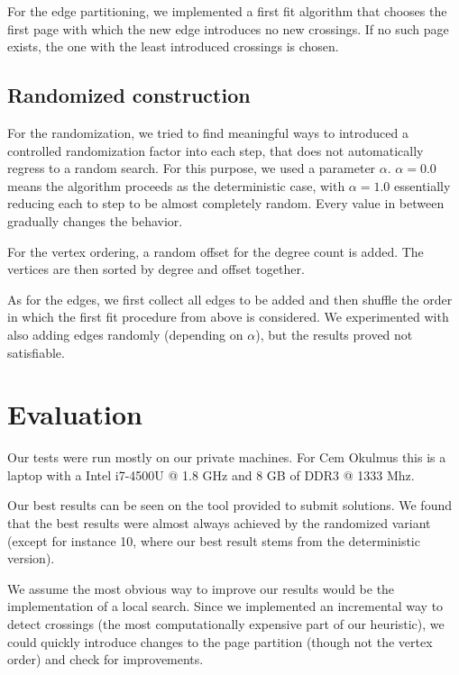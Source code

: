 \documentclass [11pt]{article}
\begin{document}
For the edge partitioning, we implemented a first fit algorithm that chooses the first page with which the new edge introduces no new crossings. If no such page exists, the one with the least introduced crossings is chosen. 

\subsection{Randomized construction}
For the randomization, we tried to find meaningful ways to introduced a controlled randomization factor into each step, that does not automatically regress to a random search. For this purpose, we used a parameter $\alpha$. $\alpha = 0.0$  means the algorithm proceeds as the deterministic case, with $\alpha = 1.0$ essentially reducing each to step to be almost completely random. Every value in between gradually changes the behavior. 

For the vertex ordering, a random offset for the degree count is added. The vertices are then sorted by degree and offset together. 

As for the edges, we first collect all edges to be added and then shuffle the order in which the first fit procedure from above is considered. We experimented with also adding edges randomly (depending on $\alpha$), but the results proved not satisfiable. 

\section{Evaluation}
Our tests were run mostly on our private machines. For Cem Okulmus this is a laptop with a Intel i7-4500U @ 1.8 GHz and 8 GB of DDR3 @ 1333 Mhz. 

Our best results can be seen on the tool provided to submit solutions. We found that the best results were almost always achieved by the randomized variant (except for instance 10, where our best result stems from the deterministic version).

We assume the most obvious way to improve our results would be the implementation of a local search. Since we implemented an incremental way to detect crossings (the most computationally expensive part of our heuristic), we could quickly introduce changes to the page partition (though not the vertex order) and check for improvements. 
\end{document}

